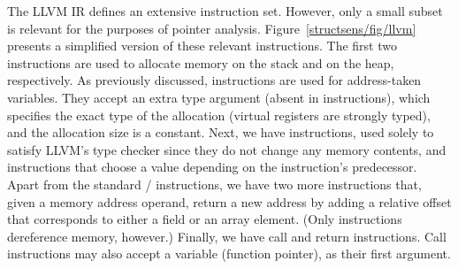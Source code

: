 The LLVM IR defines an extensive instruction set. However, only a
small subset is relevant for the purposes of pointer
analysis. Figure~\ref{structsens/fig/llvm} presents a simplified
version of these relevant instructions. The first two instructions are
used to allocate memory on the stack and on the heap, respectively. As
previously discussed,  instructions are used for
address-taken variables. They accept an extra type argument (absent in
 instructions), which specifies the exact type of the
allocation (virtual registers are strongly typed), and the allocation
size is a constant. Next, we have  instructions, used
solely to satisfy LLVM's type checker since they do not change any
memory contents, and  instructions that choose a value
depending on the instruction's predecessor. Apart from the standard
/ instructions, we have two more instructions
that, given a memory address operand, return a new address by adding a
relative offset that corresponds to either a field or an array
element. (Only  instructions dereference memory, however.)
Finally,
we have call and return instructions. Call instructions may also
accept a variable (function pointer), as their first argument.

